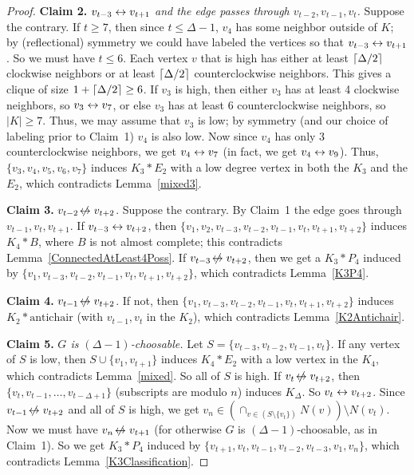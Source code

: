 \begin{proof}
\textbf{Claim 2.} \textit{$v_{t-3}\leftrightarrow v_{t+1}$ and the edge passes through
$v_{t-2},v_{t-1},v_t$.}
Suppose the contrary.
If $t\ge 7$, then since $t\le \Delta-1$, $v_4$ has some
neighbor outside of $K$; by (reflectional) symmetry we could have labeled the
vertices so that $v_{t-3}\leftrightarrow v_{t+1}$.
So we must have $t\le 6$.
Each vertex $v$ that is high has either at least $\left\lceil\Delta/2\right\rceil$ clockwise
neighbors or at least $\left\lceil\Delta/2\right\rceil$ counterclockwise neighbors.  This gives a clique
of size $1+\left\lceil\Delta/2\right\rceil\ge 6$.  If $v_3$ is high, then either $v_3$ has at
least 4 clockwise neighbors, so $v_3\leftrightarrow v_7$, or else $v_3$ has at least 6
counterclockwise neighbors, so $|K|\ge 7$.  Thus, we may assume that $v_3$ is
low; by symmetry (and our choice of labeling prior to Claim~1) $v_4$ is also
low.  Now since $v_4$ has only 3 counterclockwise neighbors, we get $v_4\leftrightarrow
v_7$ (in fact, we get $v_4\leftrightarrow v_9$).  Thus, $\{v_3,v_4,v_5,v_6,v_7\}$ induces
$K_3*E_2$ with a low degree vertex in both the $K_3$ and the $E_2$, which 
contradicts Lemma~\ref{mixed3}.

\textbf{Claim 3.} \textit{$v_{t-2} \not\!\leftrightarrow v_{t+2}$}.  Suppose the contrary.  By
Claim~1 the edge goes through $v_{t-1},v_t,v_{t+1}$.  If $v_{t-3}\leftrightarrow v_{t+2}$,
then $\{v_1,v_2,v_{t-3},v_{t-2},v_{t-1},v_t,v_{t+1},v_{t+2}\}$ induces $K_4*B$,
where $B$ is not almost complete; this contradicts
Lemma~\ref{ConnectedAtLeast4Poss}.  If $v_{t-3}\not\!\leftrightarrow v_{t+2}$, then we get a
$K_3*P_4$ induced by $\{v_1, v_{t-3}, v_{t-2}, v_{t-1}, v_t, v_{t+1},
v_{t+2}\}$, which contradicts Lemma~\ref{K3P4}. 

\textbf{Claim 4.} \textit{$v_{t-1}\not\!\leftrightarrow v_{t+2}$}.  
If not, then $\{v_1,v_{t-3},v_{t-2},v_{t-1},v_t, v_{t+1}, v_{t+2}\}$ induces
$K_2*\mbox{antichair}$ (with $v_{t-1},v_t$ in the $K_2$), which contradicts
Lemma~\ref{K2Antichair}.

\textbf{Claim 5.} \textit{$G$ is $(\Delta-1)$-choosable.}  
Let $S=\{v_{t-3},v_{t-2},v_{t-1},v_t\}$.  If any vertex of $S$ is low, then
$S\cup\{v_1,v_{t+1}\}$ induces $K_4*E_2$ with a low vertex in the $K_4$, which
contradicts Lemma~\ref{mixed}.  So all of $S$ is high.  If
$v_t\not\!\leftrightarrow v_{t+2}$, then $\{v_t,v_{t-1},\ldots, v_{t-\Delta+1}\}$ (subscripts
are modulo $n$) induces $K_{\Delta}$.  So $v_t\leftrightarrow v_{t+2}$.  Since
$v_{t-1}\not\!\leftrightarrow v_{t+2}$ and all of $S$ is high, we get $v_n\in (\cap_{v\in
(S\setminus\{v_t\})}N(v))\setminus N(v_t)$.  Now we must have $v_n\not\!\leftrightarrow
v_{t+1}$ (for otherwise $G$ is $(\Delta-1)$-choosable, as in Claim~1).  So we
get $K_3*P_4$ induced by $\{v_{t+1},v_t,v_{t-1},v_{t-2},v_{t-3},v_1,v_n\}$,
which contradicts Lemma~\ref{K3Classification}.  
\end{proof}
